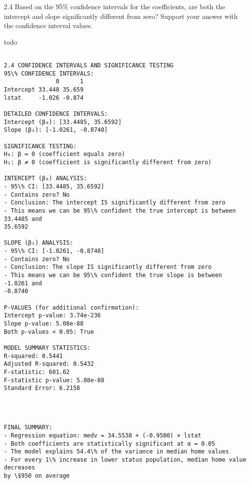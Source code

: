 \documentclass[11pt, twocolumn]{article}
\begin{document}
    2.4 Based on the 95\% confidence intervals for the coefficients, are
both the intercept and slope significantly different from zero? Support
your answer with the confidence interval values.

todo

    \begin{Verbatim}[commandchars=\\\{\}]

2.4 CONFIDENCE INTERVALS AND SIGNIFICANCE TESTING
95\% CONFIDENCE INTERVALS:
               0      1
Intercept 33.448 35.659
lstat     -1.026 -0.874

DETAILED CONFIDENCE INTERVALS:
Intercept (β₀): [33.4485, 35.6592]
Slope (β₁): [-1.0261, -0.8740]

SIGNIFICANCE TESTING:
H₀: β = 0 (coefficient equals zero)
H₁: β ≠ 0 (coefficient is significantly different from zero)

INTERCEPT (β₀) ANALYSIS:
- 95\% CI: [33.4485, 35.6592]
- Contains zero? No
- Conclusion: The intercept IS significantly different from zero
- This means we can be 95\% confident the true intercept is between 33.4485 and
35.6592

SLOPE (β₁) ANALYSIS:
- 95\% CI: [-1.0261, -0.8740]
- Contains zero? No
- Conclusion: The slope IS significantly different from zero
- This means we can be 95\% confident the true slope is between -1.0261 and
-0.8740

P-VALUES (for additional confirmation):
Intercept p-value: 3.74e-236
Slope p-value: 5.08e-88
Both p-values < 0.05: True

MODEL SUMMARY STATISTICS:
R-squared: 0.5441
Adjusted R-squared: 0.5432
F-statistic: 601.62
F-statistic p-value: 5.08e-88
Standard Error: 6.2158
    \end{Verbatim}

    \begin{center}
    \end{center}
    { \hspace*{\fill} \\}
    
    \begin{Verbatim}[commandchars=\\\{\}]

FINAL SUMMARY:
- Regression equation: medv = 34.5538 + (-0.9500) × lstat
- Both coefficients are statistically significant at α = 0.05
- The model explains 54.4\% of the variance in median home values
- For every 1\% increase in lower status population, median home value decreases
by \$950 on average
    \end{Verbatim}
\end{document}
